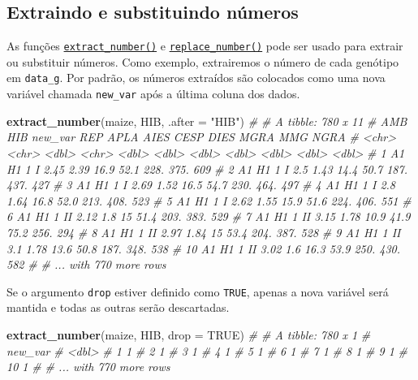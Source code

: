 \documentclass[
]{book}
\newenvironment{Shaded}{\begin{snugshade}}{\end{snugshade}}
\newcommand{\CommentTok}[1]{\textcolor[rgb]{0.56,0.35,0.01}{\textit{#1}}}
\newcommand{\DataTypeTok}[1]{\textcolor[rgb]{0.13,0.29,0.53}{#1}}
\newcommand{\KeywordTok}[1]{\textcolor[rgb]{0.13,0.29,0.53}{\textbf{#1}}}
\newcommand{\NormalTok}[1]{#1}
\newcommand{\OtherTok}[1]{\textcolor[rgb]{0.56,0.35,0.01}{#1}}
\newcommand{\StringTok}[1]{\textcolor[rgb]{0.31,0.60,0.02}{#1}}
\begin{document}
\hypertarget{extraindo-e-substituindo-nuxfameros}{%
\subsection{Extraindo e substituindo números}\label{extraindo-e-substituindo-nuxfameros}}

As funções \href{https://tiagoolivoto.github.io/metan/reference/utils_num_str.html}{\texttt{extract\_number()}} e \href{https://tiagoolivoto.github.io/metan/\%20reference\%20/\%20utils_num_str.html}{\texttt{replace\_number()}} pode ser usado para extrair ou substituir números. Como exemplo, extrairemos o número de cada genótipo em \texttt{data\_g}. Por padrão, os números extraídos são colocados como uma nova variável chamada \texttt{new\_var} após a última coluna dos dados.

\begin{Shaded}
\begin{Highlighting}[]
\KeywordTok{extract_number}\NormalTok{(maize, HIB, }\DataTypeTok{.after =} \StringTok{"HIB"}\NormalTok{)}
\CommentTok{# # A tibble: 780 x 11}
\CommentTok{#    AMB   HIB   new_var REP    APLA  AIES  CESP  DIES  MGRA   MMG  NGRA}
\CommentTok{#    <chr> <chr>   <dbl> <chr> <dbl> <dbl> <dbl> <dbl> <dbl> <dbl> <dbl>}
\CommentTok{#  1 A1    H1          1 I      2.45  2.39  16.9  52.1 228.   375.   609}
\CommentTok{#  2 A1    H1          1 I      2.5   1.43  14.4  50.7 187.   437.   427}
\CommentTok{#  3 A1    H1          1 I      2.69  1.52  16.5  54.7 230.   464.   497}
\CommentTok{#  4 A1    H1          1 I      2.8   1.64  16.8  52.0 213.   408.   523}
\CommentTok{#  5 A1    H1          1 I      2.62  1.55  15.9  51.6 224.   406.   551}
\CommentTok{#  6 A1    H1          1 II     2.12  1.8   15    51.4 203.   383.   529}
\CommentTok{#  7 A1    H1          1 II     3.15  1.78  10.9  41.9  75.2  256.   294}
\CommentTok{#  8 A1    H1          1 II     2.97  1.84  15    53.4 204.   387.   528}
\CommentTok{#  9 A1    H1          1 II     3.1   1.78  13.6  50.8 187.   348.   538}
\CommentTok{# 10 A1    H1          1 II     3.02  1.6   16.3  53.9 250.   430.   582}
\CommentTok{# # ... with 770 more rows}
\end{Highlighting}
\end{Shaded}

Se o argumento \texttt{drop} estiver definido como \texttt{TRUE}, apenas a nova variável será mantida e todas as outras serão descartadas.

\begin{Shaded}
\begin{Highlighting}[]
\KeywordTok{extract_number}\NormalTok{(maize, HIB, }\DataTypeTok{drop =} \OtherTok{TRUE}\NormalTok{)}
\CommentTok{# # A tibble: 780 x 1}
\CommentTok{#    new_var}
\CommentTok{#      <dbl>}
\CommentTok{#  1       1}
\CommentTok{#  2       1}
\CommentTok{#  3       1}
\CommentTok{#  4       1}
\CommentTok{#  5       1}
\CommentTok{#  6       1}
\CommentTok{#  7       1}
\CommentTok{#  8       1}
\CommentTok{#  9       1}
\CommentTok{# 10       1}
\CommentTok{# # ... with 770 more rows}
\end{Highlighting}
\end{Shaded}
\end{document}
